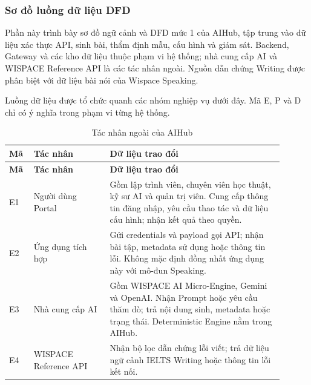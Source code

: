\clearpage
\subsubsection{Sơ đồ luồng dữ liệu DFD}
\label{aihub:sec:dfd}

Phần này trình bày sơ đồ ngữ cảnh và DFD mức 1 của AIHub, tập trung vào dữ liệu xác thực API, sinh bài, thẩm định mẫu, cấu hình và giám sát. Backend, Gateway và các kho dữ liệu thuộc phạm vi hệ thống; nhà cung cấp AI và WISPACE Reference API là các tác nhân ngoài. Nguồn dẫn chứng Writing được phân biệt với dữ liệu bài nói của Wispace Speaking.

Luồng dữ liệu được tổ chức quanh các nhóm nghiệp vụ dưới đây. Mã E, P và D chỉ có ý nghĩa trong phạm vi từng hệ thống.

\begin{longtable}{|>{\raggedright\arraybackslash}p{0.07\linewidth}|>{\raggedright\arraybackslash}p{0.25\linewidth}|p{0.58\linewidth}|}
\caption{Tác nhân ngoài của AIHub}\label{aihub:tab:dfd-entities}\\
\hline
\textbf{Mã} & \textbf{Tác nhân} & \textbf{Dữ liệu trao đổi} \\
\hline
\endfirsthead
\hline
\textbf{Mã} & \textbf{Tác nhân} & \textbf{Dữ liệu trao đổi} \\
\hline
\endhead
E1 & Người dùng Portal & Gồm lập trình viên, chuyên viên học thuật, kỹ sư AI và quản trị viên. Cung cấp thông tin đăng nhập, yêu cầu thao tác và dữ liệu cấu hình; nhận kết quả theo quyền. \\
\hline
E2 & Ứng dụng tích hợp & Gửi credentials và payload gọi API; nhận bài tập, metadata sử dụng hoặc thông tin lỗi. Không mặc định đồng nhất ứng dụng này với mô-đun Speaking. \\
\hline
E3 & Nhà cung cấp AI & Gồm WISPACE AI Micro-Engine, Gemini và OpenAI. Nhận Prompt hoặc yêu cầu thăm dò; trả nội dung sinh, metadata hoặc trạng thái. Deterministic Engine nằm trong AIHub. \\
\hline
E4 & WISPACE Reference API & Nhận bộ lọc dẫn chứng lỗi viết; trả dữ liệu ngữ cảnh IELTS Writing hoặc thông tin lỗi kết nối. \\
\hline
\end{longtable}


